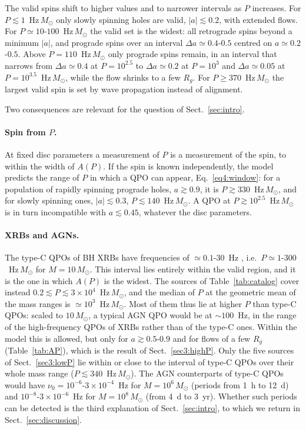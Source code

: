 The valid spins shift to higher values and to narrower intervals as $P$ increases.
For $P\lesssim1$~Hz\,$M_\odot$ only slowly spinning holes are valid, $|a|\lesssim0.2$, with extended flows.
For $P\simeq10$-$100$~Hz\,$M_\odot$ the valid set is the widest: all retrograde spins beyond a minimum $|a|$, and prograde spins over an interval $\Delta a\simeq0.4$-$0.5$ centred on $a\simeq0.2$-$0.5$.
Above $P=110$~Hz\,$M_\odot$ only prograde spins remain, in an interval that narrows from $\Delta a\simeq0.4$ at $P=10^{2.5}$ to $\Delta a\simeq0.2$ at $P=10^3$ and $\Delta a\simeq0.05$ at $P=10^{3.5}$~Hz\,$M_\odot$, while the flow shrinks to a few $R_g$.
For $P\geq370$~Hz\,$M_\odot$ the largest valid spin is set by wave propagation instead of alignment.

Two consequences are relevant for the question of Sect.~\ref{sec:intro}.

\paragraph{Spin from $P$.}
At fixed disc parameters a measurement of $P$ is a measurement of the spin, to within the width of $A(P)$.
If the spin is known independently, the model predicts the range of $P$ in which a QPO can appear, Eq.~\eqref{eq4:window}: for a population of rapidly spinning prograde holes, $a\gtrsim0.9$, it is $P\gtrsim330$~Hz\,$M_\odot$, and for slowly spinning ones, $|a|\lesssim0.3$, $P\lesssim140$~Hz\,$M_\odot$.
A QPO at $P\gtrsim10^{2.5}$~Hz\,$M_\odot$ is in turn incompatible with $a\lesssim0.45$, whatever the disc parameters.

\paragraph{XRBs and AGNs.}
The type-C QPOs of BH XRBs have frequencies of $\simeq0.1$-$30$~Hz \citep{ingram}, i.e.\ $P\simeq1$-$300$~Hz\,$M_\odot$ for $M=10\,M_\odot$.
This interval lies entirely within the valid region, and it is the one in which $A(P)$ is the widest.
The sources of Table~\ref{tab:catalog} cover instead $0.2\lesssim P\lesssim3\times10^4$~Hz\,$M_\odot$, and the median of $P$ at the geometric mean of the mass ranges is $\simeq10^3$~Hz\,$M_\odot$.
Most of them thus lie at higher $P$ than type-C QPOs: scaled to $10\,M_\odot$, a typical AGN QPO would be at $\sim100$~Hz, in the range of the high-frequency QPOs of XRBs rather than of the type-C ones.
Within the model this is allowed, but only for $a\gtrsim0.5$-$0.9$ and for flows of a few $R_g$ (Table~\ref{tab:AP}), which is the result of Sect.~\ref{sec3:highP}.
Only the five sources of Sect.~\ref{sec3:lowP} lie within or close to the interval of type-C QPOs over their whole mass range ($P\lesssim340$~Hz\,$M_\odot$).
The AGN counterparts of type-C QPOs would have $\nu_0=10^{-6}$-$3\times10^{-4}$~Hz for $M=10^6\,M_\odot$ (periods from 1~h to 12~d) and $10^{-8}$-$3\times10^{-6}$~Hz for $M=10^8\,M_\odot$ (from 4~d to 3~yr).
Whether such periods can be detected is the third explanation of Sect.~\ref{sec:intro}, to which we return in Sect.~\ref{sec:discussion}.


